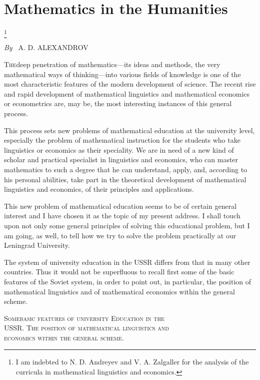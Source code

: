 
\chapter{Mathematics in the Humanities}\footnote{I am indebted to
    N. D. Andreyev and V. A. Zalgaller for the analysis of the
    curricula in mathematical linguistics and economics.}

\begin{center}
{\em By~} A. D. ALEXANDROV
\end{center}

\textsc{The}\pageoriginale deep penetration of mathematics---its ideas
and methods, the very mathematical ways of thinking---into various
fields of knowledge is one of the most characteristic features of the
modern development of science. The recent rise and rapid development
of mathematical linguistics and mathematical economics or econometrics
are, may be, the most interesting instances of this general process. 

This process sets new problems of mathematical education at the
university level, especially the problem of mathematical instruction
for the students who take linguistics or economics as their
speciality. We are in need of a new kind of scholar and practical
specialist in linguistics and economics, who can master mathematics to
such a degree that he can understand, apply, and, according to his
personal abilities, take part in the theoretical development of
mathematical linguistics and economics, of their principles and
applications.

This new problem of mathematical education seems to be of certain
general interest and I have chosen it as the topic of my present
address. I shall touch upon not only some general principles of
solving this educational problem, but I am going, as well, to tell how
we try to solve the problem practically at our Leningrad University. 

The system of university education in the USSR differs from that in
many other countries. Thus it would not be superfluous to recall first
some of the basic features of the Soviet system, in order to point
out, in particular, the position of mathematical linguistics and of
mathematical economics within the general scheme. 

\begin{center}
\textsc{Some\pageoriginale basic features of university Education in the\\ USSR. The
  position of mathematical linguistics and\\ economics within the
  general scheme.}
\end{center}

